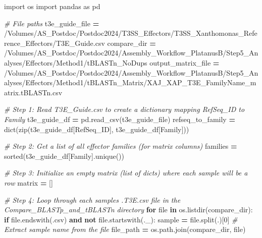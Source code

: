 \documentclass[
]{book}
\newenvironment{Shaded}{\begin{snugshade}}{\end{snugshade}}
\newcommand{\BuiltInTok}[1]{#1}
\newcommand{\CommentTok}[1]{\textcolor[rgb]{0.56,0.35,0.01}{\textit{#1}}}
\newcommand{\ControlFlowTok}[1]{\textcolor[rgb]{0.13,0.29,0.53}{\textbf{#1}}}
\newcommand{\DecValTok}[1]{\textcolor[rgb]{0.00,0.00,0.81}{#1}}
\newcommand{\ImportTok}[1]{#1}
\newcommand{\KeywordTok}[1]{\textcolor[rgb]{0.13,0.29,0.53}{\textbf{#1}}}
\newcommand{\NormalTok}[1]{#1}
\newcommand{\OperatorTok}[1]{\textcolor[rgb]{0.81,0.36,0.00}{\textbf{#1}}}
\newcommand{\StringTok}[1]{\textcolor[rgb]{0.31,0.60,0.02}{#1}}
\begin{document}
\begin{Shaded}
\begin{Highlighting}[]
\ImportTok{import}\NormalTok{ os}
\ImportTok{import}\NormalTok{ pandas }\ImportTok{as}\NormalTok{ pd}

\CommentTok{\# File paths}
\NormalTok{t3e\_guide\_file }\OperatorTok{=} \StringTok{\textquotesingle{}/Volumes/AS\_Postdoc/Postdoc2024/T3SS\_Effectors/T3SS\_Xanthomonas\_Reference\_Effectors/T3E\_Guide.csv\textquotesingle{}}
\NormalTok{compare\_dir }\OperatorTok{=} \StringTok{\textquotesingle{}/Volumes/AS\_Postdoc/Postdoc2024/Assembly\_Workflow\_PlatanusB/Step5\_Analyses/Effectors/Method1/tBLASTn\_NoDups\textquotesingle{}}
\NormalTok{output\_matrix\_file }\OperatorTok{=} \StringTok{\textquotesingle{}/Volumes/AS\_Postdoc/Postdoc2024/Assembly\_Workflow\_PlatanusB/Step5\_Analyses/Effectors/Method1/tBLASTn\_Matrix/XAJ\_XAP\_T3E\_FamilyName\_matrix.tBLASTn.csv\textquotesingle{}}

\CommentTok{\# Step 1: Read T3E\_Guide.csv to create a dictionary mapping RefSeq\_ID to Family}
\NormalTok{t3e\_guide\_df }\OperatorTok{=}\NormalTok{ pd.read\_csv(t3e\_guide\_file)}
\NormalTok{refseq\_to\_family }\OperatorTok{=} \BuiltInTok{dict}\NormalTok{(}\BuiltInTok{zip}\NormalTok{(t3e\_guide\_df[}\StringTok{\textquotesingle{}RefSeq\_ID\textquotesingle{}}\NormalTok{], t3e\_guide\_df[}\StringTok{\textquotesingle{}Family\textquotesingle{}}\NormalTok{]))}

\CommentTok{\# Step 2: Get a list of all effector families (for matrix columns)}
\NormalTok{families }\OperatorTok{=} \BuiltInTok{sorted}\NormalTok{(t3e\_guide\_df[}\StringTok{\textquotesingle{}Family\textquotesingle{}}\NormalTok{].unique())}

\CommentTok{\# Step 3: Initialize an empty matrix (list of dicts) where each sample will be a row}
\NormalTok{matrix }\OperatorTok{=}\NormalTok{ []}

\CommentTok{\# Step 4: Loop through each sample\textquotesingle{}s .T3E.csv file in the Compare\_BLASTp\_and\_tBLASTn directory}
\ControlFlowTok{for} \BuiltInTok{file} \KeywordTok{in}\NormalTok{ os.listdir(compare\_dir):}
    \ControlFlowTok{if} \BuiltInTok{file}\NormalTok{.endswith(}\StringTok{\textquotesingle{}.csv\textquotesingle{}}\NormalTok{) }\KeywordTok{and} \KeywordTok{not} \BuiltInTok{file}\NormalTok{.startswith(}\StringTok{\textquotesingle{}.\_\textquotesingle{}}\NormalTok{):}
\NormalTok{        sample }\OperatorTok{=} \BuiltInTok{file}\NormalTok{.split(}\StringTok{\textquotesingle{}.\textquotesingle{}}\NormalTok{)[}\DecValTok{0}\NormalTok{]  }\CommentTok{\# Extract sample name from the file}
\NormalTok{        file\_path }\OperatorTok{=}\NormalTok{ os.path.join(compare\_dir, }\BuiltInTok{file}\NormalTok{)}
        

\end{Highlighting}
\end{Shaded}
\end{document}
